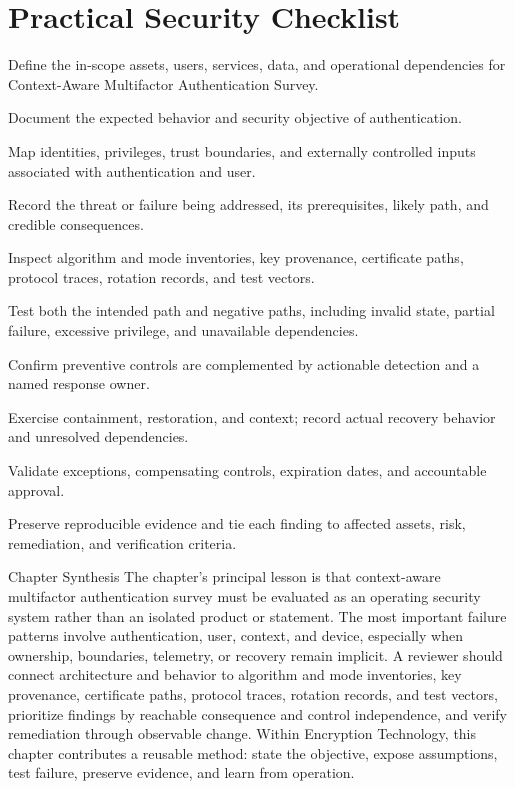 \documentclass[11pt,letterpaper]{article}
\begin{document}
\section*{Practical Security Checklist}
\begin{CornellChecklist}
\item Define the in-scope assets, users, services, data, and operational dependencies for Context-Aware Multifactor Authentication Survey.
\item Document the expected behavior and security objective of authentication.
\item Map identities, privileges, trust boundaries, and externally controlled inputs associated with authentication and user.
\item Record the threat or failure being addressed, its prerequisites, likely path, and credible consequences.
\item Inspect algorithm and mode inventories, key provenance, certificate paths, protocol traces, rotation records, and test vectors.
\item Test both the intended path and negative paths, including invalid state, partial failure, excessive privilege, and unavailable dependencies.
\item Confirm preventive controls are complemented by actionable detection and a named response owner.
\item Exercise containment, restoration, and context; record actual recovery behavior and unresolved dependencies.
\item Validate exceptions, compensating controls, expiration dates, and accountable approval.
\item Preserve reproducible evidence and tie each finding to affected assets, risk, remediation, and verification criteria.
\end{CornellChecklist}
\begin{CornellSummaryBox}{Chapter Synthesis}
The chapter's principal lesson is that context-aware multifactor authentication survey must be evaluated as an operating security system rather than an isolated product or statement. The most important failure patterns involve authentication, user, context, and device, especially when ownership, boundaries, telemetry, or recovery remain implicit. A reviewer should connect architecture and behavior to algorithm and mode inventories, key provenance, certificate paths, protocol traces, rotation records, and test vectors, prioritize findings by reachable consequence and control independence, and verify remediation through observable change. Within Encryption Technology, this chapter contributes a reusable method: state the objective, expose assumptions, test failure, preserve evidence, and learn from operation.
\end{CornellSummaryBox}
\end{document}
